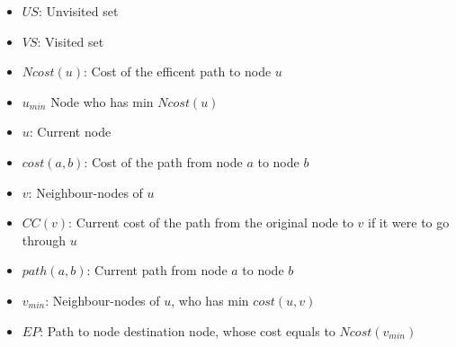 \begin{itemize}
    \item $US$: Unvisited set
    \item $VS$: Visited set
    \item $Ncost(u)$: Cost of the efficent path to node $u$
    \item $u_{min}$ Node who has min $Ncost(u)$
    \item $u$: Current node
    \item $cost(a,b)$: Cost of the path from node $a$ to node $b$
    \item $v$: Neighbour-nodes of $u$
    \item $CC(v)$: Current cost of the path from the original node to $v$ if it were to go through $u$
    \item $path(a,b)$: Current path from node $a$ to node $b$
    \item $v_{min}$: Neighbour-nodes of $u$, who has min $cost(u,v)$
    \item $EP$: Path to node destination node, whose cost equals to $Ncost(v_{min})$
\end{itemize}